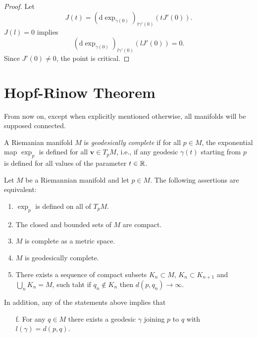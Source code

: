 \begin{proof}
  Let  \[
    J(t)=\left( \mathrm{d}\exp_{\gamma(0)} \right) _{t\gamma'(0)}(tJ'(0)).
  \] 
  $J(l)=0$ implies
  \[
    \left( \mathrm{d}\exp_{\gamma(0)} \right) _{l\gamma'(0)}\left( lJ'(0) \right) =0.
  \] 
  Since $J'(0)\neq 0$, the point is critical.
\end{proof}



\section{Hopf-Rinow Theorem}
From now on, except when explicitly mentioned otherwise, all manifolds will be supposed connected.
\begin{definition}
  A Riemanian manifold $M$ is \textit{geodesically complete} if for all  $p\in M$, the exponential map $\exp_p$ is defined for all $\mathbf{v}\in T_pM$, i.e., if any geodesic $\gamma(t)$ starting from $p$ is defined for all values of the parameter $t\in \mathbb{R}$.
\end{definition}

\begin{theorem}
  Let $M$ be a Riemannian manifold and let  $p\in M$. The following assertions are equivalent:
  \begin{enumerate}
    \item $\exp_p$ is defined on all of $T_pM$.
    \item The closed and bounded sets of $M$ are compact.
    \item $M$ is complete as a metric space.
    \item $M$ is geodesically complete.
    \item There exists a sequence of compact subsets  $K_n\subset M$, $K_n\subset K_{n+1}$ and $\bigcup_{n} K_n=M$, such taht if $q_n\notin  K_n$ then ${d}(p,q_n)\to \infty$.
  \end{enumerate}
  In addition, any of the statements above implies that 
  \begin{enumerate}
    \item [\rm{f}.]For any $q\in M$ there exists a geodesic $\gamma$ joining $p$ to $q$ with $l(\gamma)={d}(p,q)$.
  \end{enumerate}
\end{theorem}

